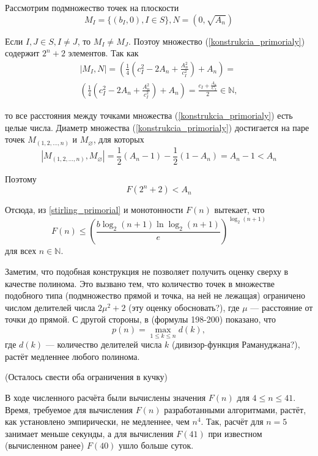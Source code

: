 \documentclass[a4paper,14pt]{article} %
\begin{document}
Рассмотрим подмножество точек на плоскости
\begin{equation}\label{konstrukcia_primorialy}
M_I=\{(b_I,0), I\in S\}, N=(0, \sqrt{A_n})
\end{equation}


Если $I,J \in S, I \neq J$, то $M_I \neq M_J$.
Поэтоу множество (\ref{konstrukcia_primorialy}) содержит $2^n+2$ элементов.
Так как
\begin{multline*}
	|M_I,N|=\left(\frac{1}{4}\left( c_I^2 - 2 A_n + \frac{A_n^2}{c_I^2} \right)+A_n\right)=\\
	\left(\frac{1}{4}\left( c_I^2 - 2 A_n + \frac{A_n^2}{c_I^2} \right)+A_n\right)=\frac{c_I+\frac{A_n}{C_I}}{2} \in \mathbb{N},
\end{multline*}

то все расстояния между точками множества (\ref{konstrukcia_primorialy}) есть целые числа.
Диаметр множества (\ref{konstrukcia_primorialy}) достигается на паре точек $M_{(1,2,...,n)}$ и $M_{\varnothing}$, для которых
$$
|M_{(1,2,...,n)},M_{\varnothing}|=\frac{1}{2}(A_n-1)-\frac{1}{2}(1-A_n) = A_n-1 < A_n
$$

Поэтому 
$$
F(2^n+2) < A_n
$$

Отсюда, из \ref{stirling_primorial} и монотонности $F(n)$ вытекает, что
$$
F(n) \leq \left( \frac{b \log_2(n+1) \ln \log_2 (n+1)}{e}\right)^{\log_2(n+1)}
$$
для всех $n\in \mathbb{N}$.


Заметим, что подобная конструкция не позволяет получить оценку сверху в качестве полинома.
Это вызвано тем, что количество точек в множестве подобного типа (подмножество прямой и точка, на ней не лежащая) ограничено числом  делителей числа $2\mu^2+2$ (эту оценку обосновать?), где $\mu$ --- расстояние от точки до прямой.
С другой стороны, в \cite{Ramanujan} (формулы 198-200) показано, что
$$
p(n)=\max\limits_{1\leq k \leq n} d(k),
$$
где $d(k)$ --- количество делителей числа $k$ (дивизор-функция Рамануджана?),
растёт медленнее любого полинома.



(Осталось свести оба ограничения в кучку)

В ходе численного расчёта были вычислены значения $F(n)$ для $4\leq n \leq 41$.
Время, требуемое для вычисления $F(n)$ разработанными алгоритмами, растёт, как установлено эмпирически, не медленнее, чем $n^4$.
Так, расчёт для $n=5$ занимает меньше секунды, а для вычисления $F(41)$ при известном (вычисленном ранее) $F(40)$ ушло больше суток.
\end{document}
